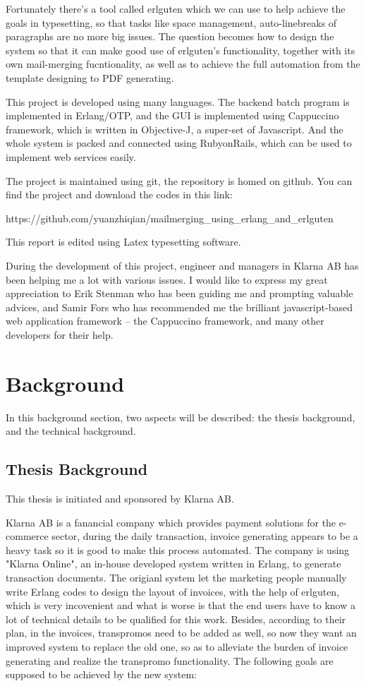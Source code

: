 \documentclass[12pt,twoside,a4paper]{report}
\begin{document}
  Fortunately there's a tool called erlguten which we can use to help achieve the goals in typesetting, so that tasks like space management, auto-linebreaks of paragraphs are no more big issues. The question becomes how to design the system so that it can make good use of erlguten's functionality, together with its own mail-merging fucntionality, as well as to achieve the full automation from the template designing to PDF generating.

  This project is developed using many languages. The backend batch program is implemented in Erlang/OTP, and the GUI is implemented using Cappuccino framework, which is written in Objective-J, a super-set of Javascript. And the whole system is packed and connected using RubyonRails, which can be used to implement web services easily. 

  The project is maintained using git, the repository is homed on github. You can find the project and download the codes in this link: 

  https://github.com/yuanzhiqian/mailmerging\_using\_erlang\_and\_erlguten

  This report is edited using Latex typesetting software.

  During the development of this project, engineer and managers in Klarna AB has been helping me a lot with various issues. I would like to express my great appreciation to Erik Stenman who has been guiding me and prompting valuable advices, and Samir Fors who has recommended me the brilliant javascript-based web application framework -- the Cappuccino framework, and many other developers for their help. 

\section{Background}
  In this background section, two aspects will be described: the thesis background, and the technical background.
\subsection{Thesis Background}
  This thesis is initiated and sponsored by Klarna AB.

  Klarna AB is a fanancial company which provides payment solutions for the e-commerce sector, during the daily transaction, invoice generating appears to be a heavy task so it is good to make this process automated. The company is using "Klarna Online", an in-house developed system written in Erlang, to generate transaction documents. The origianl system let the marketing people manually write Erlang codes to design the layout of invoices, with the help of erlguten, which is very incovenient and what is worse is that the end users have to know a lot of technical details to be qualified for this work. Besides, according to their plan, in the invoices, transpromos need to be added as well, so now they want an improved system to replace the old one, so as to alleviate the burden of invoice generating and realize the transpromo functionality. The following goals are supposed to be achieved by the new system:
\end{document}
